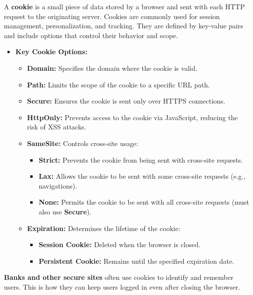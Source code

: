 \begin{Def}[Cookies]

    \label{def:cookies}
    A \textbf{cookie} is a small piece of data stored by a browser and sent with each HTTP request to the originating server. Cookies are commonly used for session management, personalization, and tracking. They are defined by key-value pairs and include options that control their behavior and scope.
    
    \begin{itemize}
        \item \textbf{Key Cookie Options:}
        \begin{itemize}
            \item \textbf{Domain:} Specifies the domain where the cookie is valid.
            \item \textbf{Path:} Limits the scope of the cookie to a specific URL path.
            \item \textbf{Secure:} Ensures the cookie is sent only over HTTPS connections.
            \item \textbf{HttpOnly:} Prevents access to the cookie via JavaScript, reducing the risk of XSS attacks.
            \item \textbf{SameSite:} Controls cross-site usage:
            \begin{itemize}
                \item \textbf{Strict:} Prevents the cookie from being sent with cross-site requests.
                \item \textbf{Lax:} Allows the cookie to be sent with some cross-site requests (e.g., navigations).
                \item \textbf{None:} Permits the cookie to be sent with all cross-site requests (must also use \textbf{Secure}).
            \end{itemize}
            \item \textbf{Expiration:} Determines the lifetime of the cookie:
            \begin{itemize}
                \item \textbf{Session Cookie:} Deleted when the browser is closed.
                \item \textbf{Persistent Cookie:} Remains until the specified expiration date.
            \end{itemize}
        \end{itemize}
    \end{itemize}
    \noindent
    \textbf{Banks and other secure sites} often use cookies to identify and remember users. This is how they can keep users logged in even after closing the browser.
    \end{Def}

